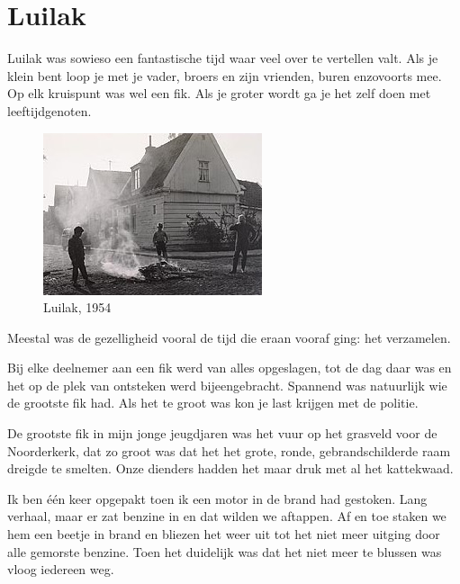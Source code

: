 \documentclass[10pt,twoside, openright]{memoir}
\begin{document}
\section{Luilak} %
\label{cha:luilak}

Luilak was sowieso een fantastische tijd waar veel over te vertellen valt. Als je klein bent loop je met je vader, broers en zijn vrienden, buren enzovoorts mee. Op elk kruispunt was wel een fik. Als je groter wordt ga je het zelf doen met leeftijdgenoten. 

\begin{figure}
\includegraphics[width=\textwidth]{img/ch9/luilak1954}
\caption*{\footnotesize Luilak, 1954}
\end{figure}

Meestal was de gezelligheid vooral de tijd die eraan vooraf ging: het verzamelen. 

Bij elke deelnemer aan een fik werd van alles opgeslagen, tot de dag daar was en het op de plek van ontsteken werd bijeengebracht. Spannend was natuurlijk wie de grootste fik had. Als het te groot was kon je last krijgen met de politie.

De grootste fik in mijn jonge jeugdjaren was het vuur op het grasveld voor de Noorderkerk, dat zo groot was dat het het grote, ronde, gebrandschilderde raam dreigde te smelten. Onze dienders hadden het maar druk met al het kattekwaad. 

Ik ben één keer opgepakt toen ik een motor in de brand had gestoken. Lang verhaal, maar er zat benzine in en dat wilden we aftappen. Af en toe staken we hem een beetje in brand en bliezen het weer uit tot het niet meer uitging door alle gemorste benzine. Toen het duidelijk was dat het niet meer te blussen was vloog iedereen weg. 
\end{document}
